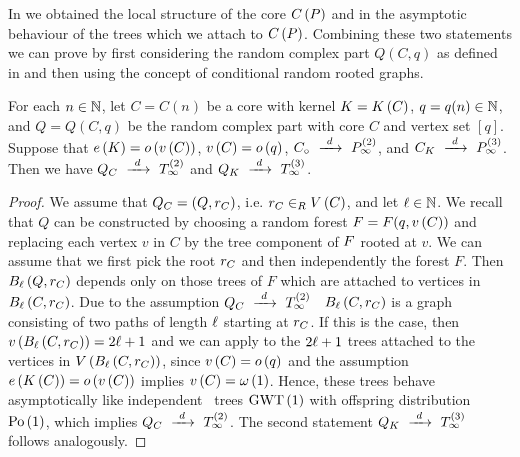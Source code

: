 In  we obtained the local structure of the core $C\left(P\right)$ and in  the asymptotic behaviour of the trees which we attach to $C\left(P\right)$. Combining these two statements we can prove  by first considering the random complex part $Q(C,q)$ as defined in  and then using the concept of conditional random rooted graphs.
\begin{lem}\label{LSlem:local_core_complex}
	For each $n\in\mathbb{N}$, let $C=C(n)$ be a core with kernel $K=K\left(C\right)$, $q=q(n)\in\mathbb{N}$, and $Q=Q(C,q)$ be the random complex part with core $C$ and vertex set $[q]$. Suppose that $e\left({K}\right)=o\left(v\left({C}\right)\right)$, $v\left({C}\right)=o\left(q\right)$, $C_\circ~\xrightarrow{~d~}~P_{\infty}^{\left(2\right)}$, and $C_K~\xrightarrow{~d~}~P_{\infty}^{\left(3\right)}$. Then we have $Q_C~\xrightarrow{~d~}~T_\infty^{\left(2\right)}$ and $Q_K~\xrightarrow{~d~}~T_\infty^{\left(3\right)}$.
\end{lem}
\begin{proof}
We assume that $Q_C=\left(Q, r_C\right)$, i.e. $r_C\in_RV\left(C\right)$, and let $\ell\in\mathbb{N}$. We recall that $Q$ can be constructed by choosing a random forest $F=F(q, v\left({C}\right))$ and replacing each vertex $v$ in $C$ by the tree component of $F$ rooted at $v$. We can assume that we first pick the root $r_C$ and then independently the forest $F$. Then $B_{\ell}\left(Q, r_C\right)$ depends only on those trees of $F$ which are attached to vertices in $B_{\ell}\left(C, r_C\right)$. Due to the assumption $Q_C~\xrightarrow{~d~}~T_\infty^{\left(2\right)}$ \whp\ $B_{\ell}\left(C, r_C\right)$ is a graph consisting of two paths of length $\ell$ starting at $r_C$. If this is the case, then $v\left({B_{\ell}\left(C, r_C\right)}\right)=2\ell+1$ and we can apply  to the $2\ell+1$ trees attached to the vertices in 
$V\left(B_{\ell}\left(C, r_C\right)\right)$, since $v\left({C}\right)=o\left(q\right)$ and the assumption $e\left({K\left(C\right)}\right)=o\left(v\left({C}\right)\right)$ implies $v\left({C}\right)=\omega\left(1\right)$. Hence, these trees behave asymptotically like independent \GW\ trees $\operatorname{GWT}\left(1\right)$ with offspring distribution $\operatorname{Po}\left(1\right)$, which implies $Q_C~\xrightarrow{~d~}~T_\infty^{\left(2\right)}$. The second statement $Q_K~\xrightarrow{~d~}~T_\infty^{\left(3\right)}$ follows analogously.
\end{proof}

